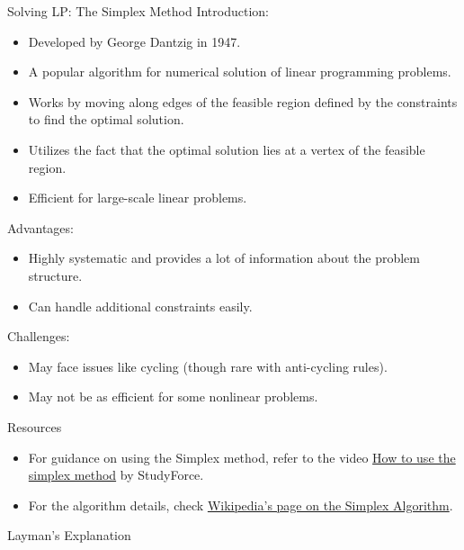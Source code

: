 \documentclass[
    NAME={Dr. Helga Ingimundardóttir},
    EMAIL={helgaingim@hi.is},
    FACULTY={Industrial Engineering},
    TITLE={Linear Optimization},
    SUBTITLE={Fundamentals and Applications},
    SEMINAR={VÉL113F},
    DATE={Design and Optimization}
]{HI-latex/hi-beamer}
\begin{document}
    \begin{frame}[allowframebreaks]{Solving LP: The Simplex Method}
        Introduction:
        \begin{itemize}
            \item Developed by George Dantzig in 1947.
            \item A popular algorithm for numerical solution of linear programming problems.
            \item Works by moving along edges of the feasible region defined by the constraints to find the optimal solution.
            \item Utilizes the fact that the optimal solution lies at a vertex of the feasible region.
            \item Efficient for large-scale linear problems.
        \end{itemize}
        \framebreak
        Advantages:
        \begin{itemize}
            \item Highly systematic and provides a lot of information about the problem structure.
            \item Can handle additional constraints easily.
        \end{itemize}
        Challenges:
        \begin{itemize}
            \item May face issues like cycling (though rare with anti-cycling rules).
            \item May not be as efficient for some nonlinear problems.
        \end{itemize}

        \begin{block}{Resources}
            \begin{itemize}
                \item For guidance on using the Simplex method, refer to the video \href{https://www.youtube.com/watch?v=TVbLWxN8q7I}{How to use the simplex method} by StudyForce.
                \item For the algorithm details, check \href{https://en.wikipedia.org/wiki/Simplex_algorithm}{Wikipedia's page on the Simplex Algorithm}.
            \end{itemize}
        \end{block}

        \framebreak

        \begin{block}{Layman's Explanation}
\end{block}
\end{frame}
\end{document}
